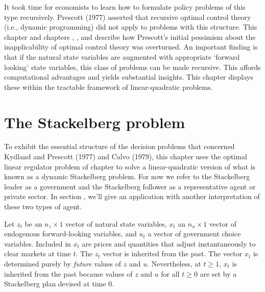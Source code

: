 It took  time for economists to learn how to formulate policy problems of this type
recursively.
Prescott  (1977) asserted that
 recursive optimal control theory (i.e., dynamic programming) did not apply
to problems with this structure.  This chapter and chapters ,
, and  describe
how Prescott's initial pessimism about the inapplicability
of optimal control theory was overturned.
An important finding is that if the natural state variables
are augmented with appropriate `forward looking' state variables, this class of problems
can be made recursive. This affords
computational advantages and yields substantial insights.
  This chapter displays these
within the tractable framework of linear-quadratic problems.

\section{The Stackelberg problem}

To exhibit the essential structure of
the decision problems that concerned Kydland and Prescott (1977) and Calvo (1979),
this chapter uses the optimal linear regulator problem of chapter 
to solve a linear-quadratic version of
what is known as a dynamic Stackelberg problem.
For now we refer to the Stackelberg leader as a government and
the Stackelberg follower as a representative agent or
private sector.  In section ,   we'll give
an application with another  interpretation of these two types of agent.


Let $z_t$ be  an $n_z \times 1$  vector of natural state variables,
$x_t$ an $n_x \times 1$  vector of  endogenous forward-looking variables, and $u_t$ a vector of government choice variables.
Included in $x_t$ are prices and quantities that adjust
instantaneously to clear markets at time $t$.
The $z_t$ vector is inherited from the past.
The vector $x_t$ is  determined purely by {\it future} values of $z$ and $u$.
Nevertheless,   at $t \geq 1$, $x_t$ is  inherited from the past  because
values of $z$ and $u$ for all $ t \geq 0$ are set  by a Stackelberg plan devised at time $0$.


